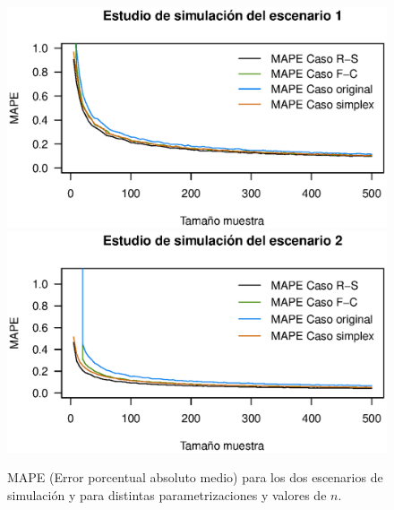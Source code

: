 \begin{figure}
	\begin{center}
		\includegraphics[scale=0.45]{Mape_gnrl.eps}	
		\quad
		\includegraphics[scale=0.45]{Mape_gnrl_infla.eps}
		\caption{MAPE (Error porcentual absoluto medio) para los dos escenarios de simulaci\'{o}n y para distintas parametrizaciones y valores de $n$.}
		\label{Mapes}
	\end{center}
\end{figure}

